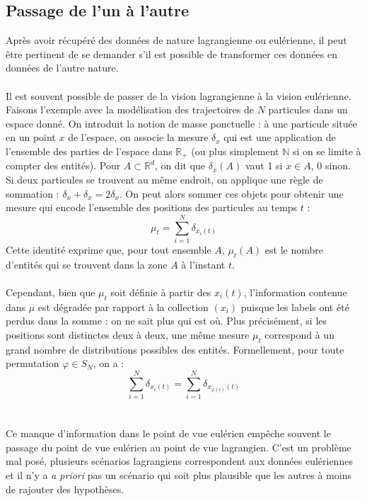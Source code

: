 \documentclass[12pt]{article}
\newcommand{\N}{\mathbb{N}}
\newcommand{\R}{\mathbb{R}}
\begin{document}
\subsection{Passage de l'un à l'autre}
Après avoir récupéré des données de nature lagrangienne ou eulérienne, il peut être pertinent de se demander s'il est possible de transformer ces données en données de l'autre nature.\\
\\
Il est souvent possible de passer de la vision lagrangienne à la vision eulérienne. Faisons l'exemple avec la modélisation des trajectoires de $N$ particules dans un espace donné. On introduit la notion de masse ponctuelle : à une particule située en un point $x$ de l'espace, on associe la mesure $\delta_x$ qui est une application de l'ensemble des parties de l'espace dans $\R_+$ (ou plus simplement $\N$ si on se limite à compter des entités). Pour $A  \subset \R^d$, on dit que $\delta_x(A)$ vaut 1 si $x \in A$, 0 sinon. Si deux particules se trouvent au même endroit, on applique une règle de sommation : $\delta_x + \delta_x = 2\delta_x$. On peut alors sommer ces objets pour obtenir une mesure qui encode l'ensemble des positions des particules au temps $t$ : \[ \mu_t = \sum_{i=1}^{N} \delta_{x_i(t)}\] Cette identité exprime que, pour tout ensemble $A$, $\mu_t(A)$ est le nombre d'entités qui se trouvent dans la zone $A$ à l'instant $t$.\\
\\
Cependant, bien que $\mu_t$ soit définie à partir des $x_i(t)$, l'information contenue dans $\mu$ est dégradée par rapport à la collection $(x_i)$ puisque les labels ont été perdus dans la somme : on ne sait plus qui est où. Plus précisément, si les positions sont distinctes deux à deux, une même mesure $\mu_t$ correspond à un grand nombre de distributions possibles des entités. Formellement, pour toute permutation $\varphi \in S_N$, on a : \[ \sum_{i=1}^{N} \delta_{x_i(t)} = \sum_{i=1}^{N} \delta_{x_{\varphi(i)}(t)}\]\\
\\
Ce manque d'information dans le point de vue eulérien empêche souvent le passage du point de vue eulérien au point de vue lagrangien. C'est un problème mal posé, plusieurs scénarios lagrangiens correspondent aux données eulériennes et il n'y a  \textit{a priori} pas un scénario qui soit plus plausible que les autres à moins de rajouter des hypothèses.\\
\\
\end{document}
